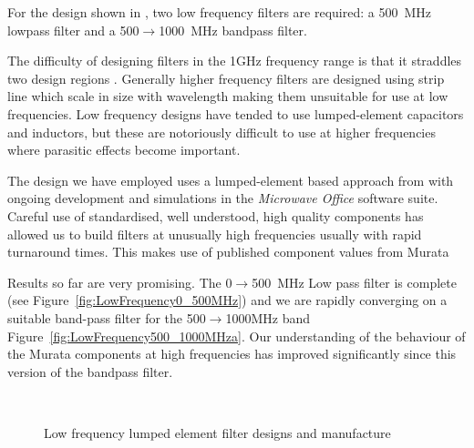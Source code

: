 For the design shown in , two low frequency filters are required: a 500~MHz lowpass filter and a 500$\rightarrow$1000~MHz bandpass filter.

The difficulty of designing filters in the 1GHz frequency range is that it straddles two design regions \cite{matthaei1980} . Generally higher frequency filters are designed using strip line which scale in size with wavelength making them unsuitable for use at low frequencies. Low frequency designs have tended to use lumped-element capacitors and inductors, but these are notoriously difficult to use at higher frequencies where parasitic effects become important.

The design we have employed uses a lumped-element based approach from  with ongoing development and simulations in the \textit{Microwave Office} software suite. Careful use of standardised, well understood, high quality components has allowed us to build filters at unusually high frequencies usually with rapid turnaround times. This makes use of published component values from Murata \cite{murataAWR}

Results so far are very promising. The 0$\rightarrow$500~MHz Low pass filter is complete (see Figure~\ref{fig:LowFrequency0_500MHz}) and we are rapidly converging on a suitable band-pass filter for the 500$\rightarrow$1000MHz band Figure~\ref{fig:LowFrequency500_1000MHza}. Our understanding of the behaviour of the Murata components at high frequencies has improved significantly since this version of the bandpass filter.



\begin{figure}
 \centering
{}\\


 \caption{Low frequency lumped element filter designs and manufacture}
 \label{fig:filterDesigns}
\end{figure}


